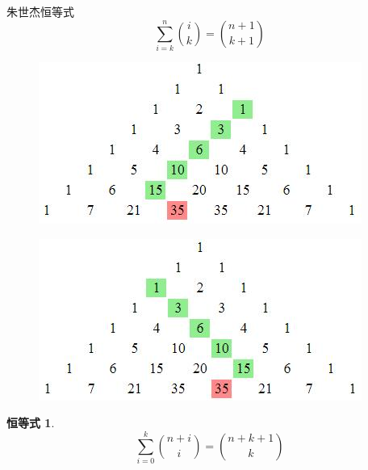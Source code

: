 \documentclass[punct]{ctexbeamer}
\newtheorem{iden}{恒等式}
\begin{document}
\begin{frame}

    \begin{block}{朱世杰恒等式}
        $$\sum_{i=k}^{n}\binom{i}{k}=\binom{n+1}{k+1}$$
    \end{block}



    \begin{minipage}{0.45\linewidth}
        \begin{figure}
            \centering
            \includegraphics[scale=0.4]{HockeyStick_L.jpeg}
        \end{figure}
    \end{minipage}
    \hspace{10pt}
    \begin{minipage}{0.45\linewidth}
        \begin{figure}
            \centering
            \includegraphics[scale=0.4]{HockeyStick_R.jpeg}
        \end{figure}
    \end{minipage}


    \begin{iden}
        $$\sum_{i=0}^{k}\binom{n+i}{i}=\binom{n+k+1}{k}$$
    \end{iden}
\end{frame}
\end{document}
